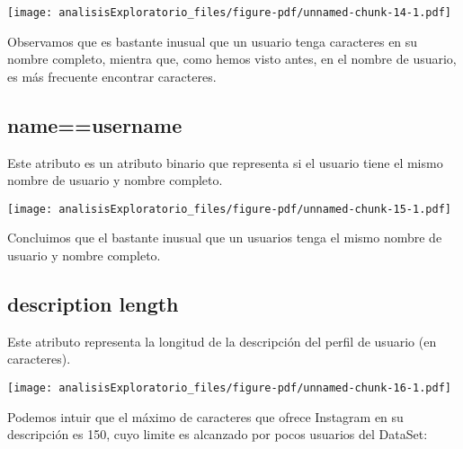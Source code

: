 \documentclass[
  letterpaper,
  DIV=11,
  numbers=noendperiod]{scrreprt}
\newenvironment{Shaded}{\begin{snugshade}}{\end{snugshade}}
\newcommand{\AttributeTok}[1]{\textcolor[rgb]{0.40,0.45,0.13}{#1}}
\newcommand{\DecValTok}[1]{\textcolor[rgb]{0.68,0.00,0.00}{#1}}
\newcommand{\FunctionTok}[1]{\textcolor[rgb]{0.28,0.35,0.67}{#1}}
\newcommand{\NormalTok}[1]{\textcolor[rgb]{0.00,0.23,0.31}{#1}}
\newcommand{\SpecialCharTok}[1]{\textcolor[rgb]{0.37,0.37,0.37}{#1}}
\newcommand{\StringTok}[1]{\textcolor[rgb]{0.13,0.47,0.30}{#1}}
\begin{document}
\texttt{[image: analisisExploratorio\_files/figure-pdf/unnamed-chunk-14-1.pdf]}

Observamos que es bastante inusual que un usuario tenga caracteres en su
nombre completo, mientra que, como hemos visto antes, en el nombre de
usuario, es más frecuente encontrar caracteres.

\subsection{name==username}\label{nameusername}

Este atributo es un atributo binario que representa si el usuario tiene
el mismo nombre de usuario y nombre completo.

\begin{Shaded}
\end{Shaded}

\texttt{[image: analisisExploratorio\_files/figure-pdf/unnamed-chunk-15-1.pdf]}

Concluimos que el bastante inusual que un usuarios tenga el mismo nombre
de usuario y nombre completo.

\subsection{description length}\label{description-length}

Este atributo representa la longitud de la descripción del perfil de
usuario (en caracteres).

\begin{Shaded}
\end{Shaded}

\texttt{[image: analisisExploratorio\_files/figure-pdf/unnamed-chunk-16-1.pdf]}

Podemos intuir que el máximo de caracteres que ofrece Instagram en su
descripción es 150, cuyo limite es alcanzado por pocos usuarios del
DataSet:
\end{document}
